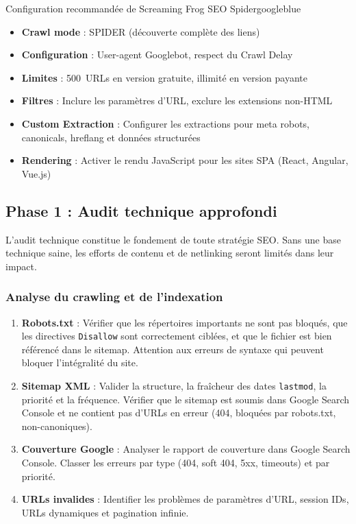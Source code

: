 \documentclass[12pt,a4paper,twoside]{report}
\begin{document}
\begin{mybox}{Configuration recommandée de Screaming Frog SEO Spider}{googleblue}
\begin{itemize}
    \item \textbf{Crawl mode} : SPIDER (découverte complète des liens)
    \item \textbf{Configuration} : User-agent Googlebot, respect du Crawl Delay
    \item \textbf{Limites} : 500~URLs en version gratuite, illimité en version payante
    \item \textbf{Filtres} : Inclure les paramètres d'URL, exclure les extensions non-HTML
    \item \textbf{Custom Extraction} : Configurer les extractions pour meta robots, canonicals, hreflang et données structurées
    \item \textbf{Rendering} : Activer le rendu JavaScript pour les sites SPA (React, Angular, Vue.js)
\end{itemize}
\end{mybox}

\subsection{Phase 1 : Audit technique approfondi}

L'audit technique constitue le fondement de toute stratégie SEO. Sans une base technique saine, les efforts de contenu et de netlinking seront limités dans leur impact.

\subsubsection{Analyse du crawling et de l'indexation}

\begin{enumerate}
    \item \textbf{Robots.txt} : Vérifier que les répertoires importants ne sont pas bloqués, que les directives \texttt{Disallow} sont correctement ciblées, et que le fichier est bien référencé dans le sitemap. Attention aux erreurs de syntaxe qui peuvent bloquer l'intégralité du site.
    \item \textbf{Sitemap XML} : Valider la structure, la fraîcheur des dates \texttt{lastmod}, la priorité et la fréquence. Vérifier que le sitemap est soumis dans Google Search Console et ne contient pas d'URLs en erreur (404, bloquées par robots.txt, non-canoniques).
    \item \textbf{Couverture Google} : Analyser le rapport de couverture dans Google Search Console. Classer les erreurs par type (404, soft 404, 5xx, timeouts) et par priorité.
    \item \textbf{URLs invalides} : Identifier les problèmes de paramètres d'URL, session IDs, URLs dynamiques et pagination infinie.
\end{enumerate}
\end{document}
